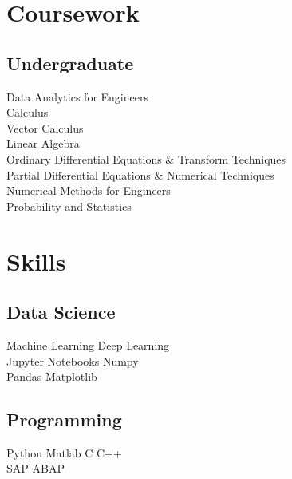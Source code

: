 \documentclass[]{deedy-resume-openfont}
\begin{document}
\begin{minipage}[t]{0.33\textwidth}
\sectionsep

\section{Coursework}

\vspace{5pt}
\subsection{Undergraduate}
\vspace{3pt}
Data Analytics for Engineers \\
Calculus \\
Vector Calculus \\
Linear Algebra \\
Ordinary Differential Equations \& Transform Techniques\\
Partial Differential Equations \& \space Numerical Techniques\\
Numerical Methods for Engineers\\
Probability and Statistics\\
\sectionsep


\section{Skills}

\vspace{5pt}
\subsection{Data Science}
\vspace{2pt}
Machine Learning \textbullet{} Deep Learning\\
Jupyter Notebooks \textbullet{} Numpy \\
\textbullet{} Pandas \textbullet{} Matplotlib\\ 

\vspace{8pt}
\subsection{Programming}
\vspace{2pt}
 Python \textbullet{} Matlab \textbullet{}
C \textbullet{} C++ \\
SAP ABAP \\


\end{minipage}
\end{document}
